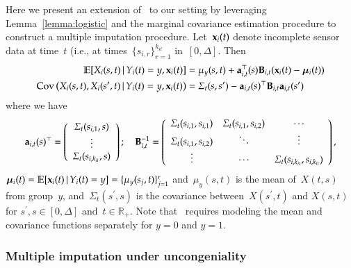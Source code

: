 \documentclass[12pt]{amsart}
\def\E{\mathcal{E}}
\def\E{\mathbb{E}}
\def\given{\, | \,}
\def\bfx{{\bf x}}
\def\bfT{{\bf T}}
\def\bfD{{\bf D}}
\begin{document}
Here we present an extension of~\cite{Petrovich2018} to our setting by leveraging Lemma~\ref{lemma:logistic} and the marginal covariance estimation procedure to construct a multiple imputation procedure. Let~$\bfx_{i} (t)$ denote incomplete sensor data at time~$t$ (i.e., at times~$\{ s_{i,r} \}_{r=1}^{k_{it}}$ in~$[0,\Delta]$. Then
\begin{align}
\label{eq:impute}
\E [ X_i (s,t) \given Y_i(t) = y, \bfx_i (t) ]
  &= \mu_y (s,t) + {\bf a}_{i,t}^\top (s) {\bf B}_{i,t} (\bfx_i (t) -
    \mathbold{\mu}_i (t) ) \\
\text{Cov} \left( X_i (s,t), X_i (s^\prime, t) \given Y_i (t) = y,
  \bfx_i (t) \right)
  &= \Sigma_{t} (s, s^\prime) -
    {\bf a}_{i,t} (s)^\top {\bf B}_{i,t} {\bf a}_{i,t} (s^\prime)
\end{align}
where we have
\[
{\bf a}_{i,t} (s)^\top = \left( \begin{array}{c} \Sigma_t (s_{i,1}, s) \\ \vdots \\
                       \Sigma_t (s_{i,k_{it}}, s) \end{array} \right); \quad
{\bf B}_{i,t}^{-1} = \left(
  \begin{array}{c c c}
    \Sigma_t(s_{i,1}, s_{i,1}) & \Sigma_t(s_{i,1}, s_{i,2}) & \cdots \\
    \Sigma_t(s_{i,1}, s_{i,2}) & \ddots & \vdots \\
    \vdots & \cdots & \Sigma_t (s_{i,k_{it}}, s_{i,k_{it}})
  \end{array} \right),
\]
$\mathbold{\mu}_i (t) = \E [ \bfx_i (t) \given Y_i (t) = y] = \{
\mu_y (s_{j}, t) \}_{j=1}^r$ and~$\mu_y (s,t)$ is the mean of~$X(t,s)$
from group~$y$, and~$\Sigma_t ( s^\prime, s)$ is the covariance
between~$X(s^\prime,t)$ and $X(s,t)$ for $s^\prime, s \in [0, \Delta]$
and~$t \in \mathbb{R}_+$. Note that~\cite{Petrovich2018} requires modeling the mean and covariance functions separately for $y=0$ and $y=1$.

\subsubsection{Multiple imputation under uncongeniality}
\label{section:miuncong}
\end{document}
